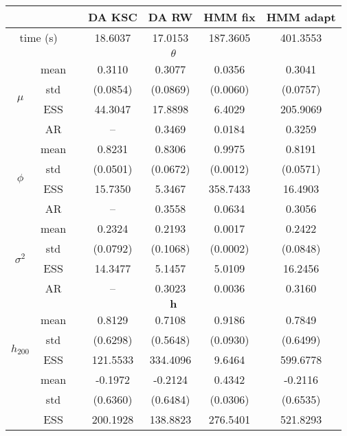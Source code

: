 { \renewcommand{\arraystretch}{1.2} 
\begin{table} 
\center 
\begin{tabular}{ccc cc cc} 
\hline 
 & && DA KSC & DA RW & HMM fix & HMM adapt \\ \hline  \hline
 \multicolumn{2}{c}{time (s)}& & 18.6037  & 17.0153  & 187.3605  & 401.3553  \\  \hline 
\multicolumn{7}{c}{$\theta$} \\ \hline 
\multirow{4}{*}{$\mu$}   & mean  &   & 0.3110  & 0.3077  & 0.0356  & 0.3041  \\ [0.75ex]
 & std  &   & (0.0854)  & (0.0869)  & (0.0060)  & (0.0757)  \\ [0.75ex]
 & ESS  &   & 44.3047  & 17.8898  & 6.4029  & 205.9069  \\ [0.75ex]
 & AR && --  & 0.3469  & 0.0184  & 0.3259  \\ [1.3ex] 
\multirow{4}{*}{$\phi$}   & mean  &   & 0.8231  & 0.8306  & 0.9975  & 0.8191  \\ [0.75ex]
 & std  &   & (0.0501)  & (0.0672)  & (0.0012)  & (0.0571)  \\ [0.75ex]
 & ESS  &   & 15.7350  & 5.3467  & 358.7433  & 16.4903  \\ [0.75ex]
 & AR && --  & 0.3558  & 0.0634  & 0.3056  \\ [1.3ex] 
\multirow{4}{*}{$\sigma^2$}   & mean  &   & 0.2324  & 0.2193  & 0.0017  & 0.2422  \\ [0.75ex]
 & std  &   & (0.0792)  & (0.1068)  & (0.0002)  & (0.0848)  \\ [0.75ex]
 & ESS  &   & 14.3477  & 5.1457  & 5.0109  & 16.2456  \\ [0.75ex]
 & AR && --  & 0.3023  & 0.0036  & 0.3160  \\ [1.3ex] 
\hline 
\multicolumn{7}{c}{$ \bm{h} $} \\ \hline 
\multirow{4}{*}{$h_{200}$}   & mean &   & 0.8129  & 0.7108  & 0.9186  & 0.7849  \\ [0.75ex]
 & std &   & (0.6298)  & (0.5648)  & (0.0930)  & (0.6499)  \\ [0.75ex]
 & ESS  &   & 121.5533  & 334.4096  & 9.6464  & 599.6778  \\ [1.3ex] 
\multirow{4}{*}{$h_{600}$}   & mean &   & -0.1972  & -0.2124  & 0.4342  & -0.2116  \\ [0.75ex]
 & std &   & (0.6360)  & (0.6484)  & (0.0306)  & (0.6535)  \\ [0.75ex]
 & ESS  &   & 200.1928  & 138.8823  & 276.5401  & 521.8293  \\ [1.3ex] 

\end{tabular}
\end{table}}
